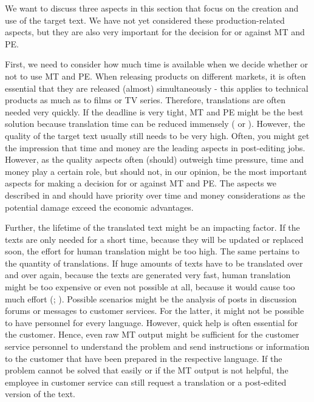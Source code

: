 We want to discuss three aspects in this section that focus on the creation and use of the target text. We have not yet considered these production-related aspects, but they are also very important for the decision for or against MT and PE.

First, we need to consider how much time is available when we decide whether or not to use MT and PE. When releasing products on different markets, it is often essential that they are released (almost) simultaneously - this applies to technical products as much as to films or TV series. Therefore, translations are often needed very quickly. If the deadline is very tight, MT and PE might be the best solution because translation time can be reduced immensely (\citealt{carl_post-editing_2015} or \citealt{nitzke_comparing_2016}). However, the quality of the target text usually still needs to be very high. Often, you might get the impression that time and money are the leading aspects in post-editing jobs. However, as the quality aspects often (should) outweigh time pressure, time and money play a certain role, but should not, in our opinion, be the most important aspects for making a decision for or against MT and PE. The aspects we described in  and  should have priority over time and money considerations as the potential damage exceed the economic advantages.

Further, the lifetime of the translated text might be an impacting factor. If the texts are only needed for a short time, because they will be updated or replaced soon, the effort for human translation might be too high. The same pertains to the quantity of translations. If huge amounts of texts have to be translated over and over again, because the texts are generated very fast, human translation might be too expensive or even not possible at all, because it would cause too much effort (\citealt{way2013traditional}; \citealt{hu2016comparative}). Possible scenarios might be the analysis of posts in discussion forums or messages to customer services. For the latter, it might not be possible to have personnel for every language. However, quick help is often essential for the customer. Hence, even raw MT output might be sufficient for the customer service personnel to understand the problem and send instructions or information to the customer that have been prepared in the respective language. If the problem cannot be solved that easily or if the MT output is not helpful, the employee in customer service can still request a translation or a post-edited version of the text.

